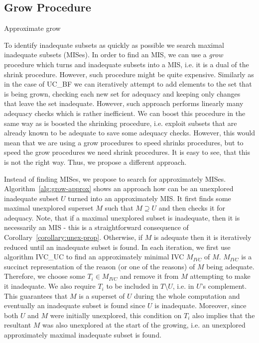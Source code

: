 \subsection{Grow Procedure}
 
\begin{algorithm}[!t]

\caption{Approximate grow}
\end{algorithm}

To identify inadequate subsets as quickly as possible we search  maximal inadequate subsets (MISes).  
In order to find an MIS, we can use a \emph{grow} procedure which turns and inadequate subsets into a MIS, i.e. it is a dual of the shrink procedure. However, such procedure might be quite expensive. Similarly as in the case of UC\_BF we can iteratively attempt to add elements to the set that is being
grown, checking each new set for adequacy and keeping only changes that
leave the set inadequate. However, such approach performs linearly many adequacy checks which is rather inefficient. We can boost this procedure in the same way as is boosted the shrinking procedure, i.e. exploit subsets that are already known to be adequate to save some adequacy checks. However, this would mean that we are using a grow procedures to speed shrinks procedures, but to speed the grow procedures we need shrink procedures. It is easy to see, that this is not the right way. Thus, we propose a different approach. 

Instead of finding MISes, we propose to search for approximately MISes. Algorithm~\ref{alg:grow-approx} shows an approach how can be an unexplored inadequate subset $U$ turned into an approximately MIS. It first finds some maximal unexplored superset $M$ such that $M \supseteq U$ and then checks it for adequacy. Note, that if a maximal unexplored subset is inadequate, then it is necessarily an MIS - this is a straightforward consequence of Corollary~\ref{corollary:unex-prop}. 
Otherwise, if $M$ is adequate then it is iteratively reduced until an inadequate subset is found. In each iteration, we first use algorithm IVC\_UC to find an approximately minimal IVC $M_{IVC}$ of $M$. $M_{IVC}$ is a succinct representation of the reason (or one of the reasons) of $M$ being adequate. Therefore, we choose some $T_i \in M_{IVC}$ and remove it from $M$ attempting to make it inadequate. We also require $T_i$ to be included in $T \setminus U$, i.e. in $U$'s complement. This guarantees that $M$ is a superset of $U$ during the whole computation and eventually an inadequate subset is found since $U$ is inadequate. Moreover, since both $U$ and $M$ were initially unexplored, this condition on $T_i$ also implies that the resultant $M$ was also unexplored at the start of the growing, i.e. an unexplored approximately maximal inadequate subset is found. 

